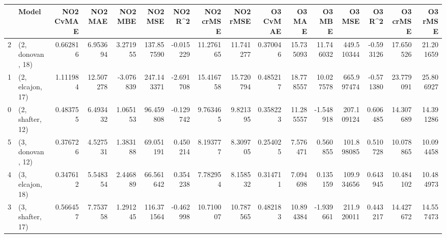 \begin{tabular}{llrrrrrrrrrrrrrr}
\toprule
{} &             Model &  NO2 CvMAE &    NO2 MAE &   NO2 MBE &     NO2 MSE &   NO2 R\textasciicircum2 &  NO2 crMSE &   NO2 rMSE &  O3 CvMAE &     O3 MAE &     O3 MBE &      O3 MSE &    O3 R\textasciicircum2 &   O3 crMSE &    O3 rMSE \\
\midrule
2 &  (2, donovan, 18) &   0.662816 &   6.953694 &  3.271955 &  137.857590 & -0.015229 &  11.276165 &  11.741277 &  0.370046 &  15.735093 &  11.746032 &  449.510344 & -0.593126 &  17.650526 &  21.201659 \\
1 &  (2, elcajon, 17) &   1.111984 &  12.507278 & -3.076839 &  247.143371 & -2.691708 &  15.416758 &  15.720794 &  0.485217 &  18.778557 &  10.027578 &  665.997474 & -0.571380 &  23.779091 &  25.806927 \\
0 &  (2, shafter, 12) &   0.483755 &   6.493432 &  1.065153 &   96.459808 & -0.129742 &   9.763465 &   9.821395 &  0.358223 &  11.285557 &  -1.548918 &  207.109124 &  0.606485 &  14.307689 &  14.391286 \\
5 &  (3, donovan, 12) &   0.376726 &   4.527531 &  1.383188 &   69.051191 &  0.450214 &   8.193777 &   8.309705 &  0.254025 &   7.576471 &   0.560855 &  101.898085 &  0.510728 &  10.078865 &  10.094458 \\
4 &  (3, elcajon, 18) &   0.347612 &   5.548354 &  2.446889 &   66.561642 &  0.354238 &   7.782954 &   8.158532 &  0.314711 &   7.094698 &   0.135159 &  109.934656 &  0.643945 &  10.484102 &  10.484973 \\
3 &  (3, shafter, 17) &   0.566457 &   7.753758 &  1.291245 &  116.371564 & -0.462998 &  10.710007 &  10.787565 &  0.482183 &  10.894384 &  -1.939661 &  211.920011 &  0.443217 &  14.427672 &  14.557473 \\
\bottomrule
\end{tabular}
